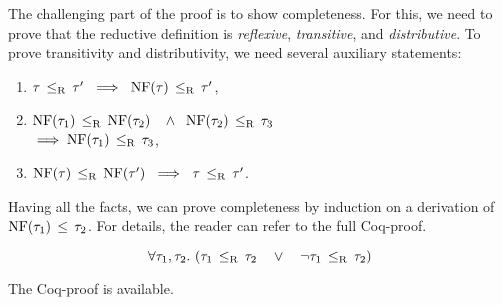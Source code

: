 The challenging part of the proof is to show completeness. 
For this, we need to prove that 
the reductive definition is \emph{reflexive}, \emph{transitive},
and \emph{distributive}.
To prove transitivity and distributivity, 
we need several auxiliary statements:
\begin{enumerate}
  \item $\bjsubr{\ty}{\ty'}\ \implies\ \bjsubr{\NF(\ty)}{\ty'}$,
  \item $\bjsubr{\NF(\ty_1)}{\NF(\ty_2)}\;\;\ \land\;\; \bjsubr{\NF(\ty_2)}{\ty_3}$\\
     $\implies \mathop{\mathrm{NF}}(\tau_1) \, \leq_\mathrm{R} \, \tau_3$,
  \item $\bjsubr{\NF(\ty)}{\NF(\ty')}\ \implies\ \bjsubr{\ty}{\ty'}$.
\end{enumerate}
Having all the facts, we can prove completeness by induction
on a derivation of $\mathop{\mathrm{NF}}(\tau_1) \, \leq \, \tau_2$.
For details, the reader can refer to the full Coq-proof.

\begin{theorem}\label{thm:redsub-decidable}
\[
\forall \ty_1, \ty_2.\ 
(\bjsubr{\ty_1}{\ty_2}\quad \lor\quad \lnot \bjsubr{\ty_1}{\ty_2})
\]
\end{theorem}
\noindent
The Coq-proof is available.
